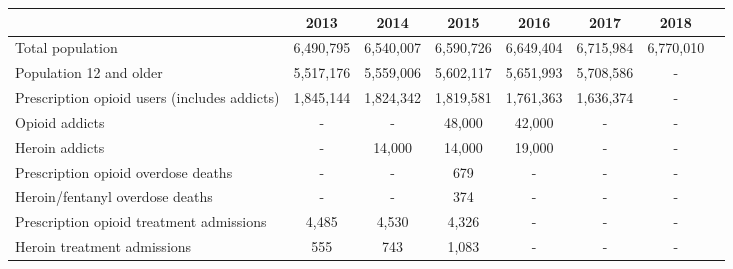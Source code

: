 \documentclass[12pt]{article}
\begin{document}
\begin{tabular}{|l|c|c|c|c|c|c|l}
\hline
 & \footnotesize{2013} & \footnotesize{2014} & \footnotesize{2015} & \footnotesize{2016} & \footnotesize{2017} & \footnotesize{2018}\\
\hline
\footnotesize
Total population & \footnotesize{6,490,795} & \footnotesize{6,540,007} & \footnotesize{6,590,726} & \footnotesize{6,649,404} & \footnotesize{6,715,984} & \footnotesize{6,770,010}\\
\footnotesize
Population 12 and older & \footnotesize{5,517,176} & \footnotesize{5,559,006} & \footnotesize{5,602,117} & \footnotesize{5,651,993} & \footnotesize{5,708,586} & -\\
\footnotesize
Prescription opioid users (includes addicts) & \footnotesize{1,845,144} &\footnotesize{1,824,342} & \footnotesize{1,819,581} & \footnotesize{1,761,363} &  \footnotesize{1,636,374} &-\\
\footnotesize
Opioid addicts & - & - & \footnotesize{48,000} & \footnotesize{42,000} & - &-\\
\footnotesize
Heroin addicts & - &\footnotesize{14,000} & \footnotesize{14,000} & \footnotesize{19,000}  & - &-\\
\footnotesize
Prescription opioid overdose deaths & - & - & \footnotesize{679} & -  & - &-\\
\footnotesize
Heroin/fentanyl overdose deaths & - & - & \footnotesize{374} & -  & - &-\\
\footnotesize
Prescription opioid treatment admissions & \footnotesize{4,485} & \footnotesize{4,530} & \footnotesize{4,326} & -  & - &-\\
\footnotesize
Heroin treatment admissions & \footnotesize{555} & \footnotesize{743} & \footnotesize{1,083} & -  & - &-\\
\hline
\end{tabular} \\
\label{tab:template}
\end{document}
